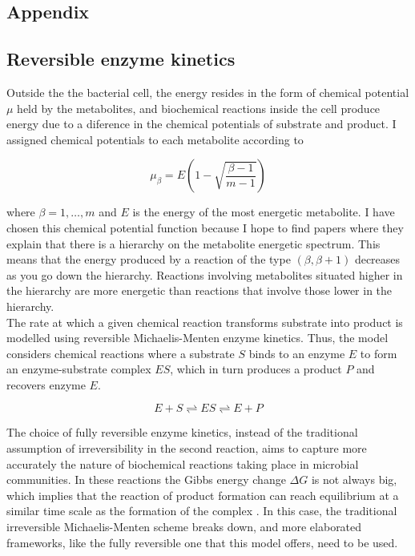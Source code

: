 \documentclass[titlepage,11pt]{article}
\begin{document}
\begin{linenumbers}
\begin{singlespace}
\section{Appendix}
\subsection{Reversible enzyme kinetics}\label{subsed:reversible_enzyme_kinetics}
Outside the the bacterial cell, the energy resides in the form of chemical potential $ \mu $ held by the metabolites, and biochemical reactions inside the cell produce energy due to a diference in the chemical potentials of substrate and product. I assigned chemical potentials to each metabolite according to
\begin{linenomath*}	
	\begin{equation}
	\mu_{\beta} = E \left(1 - \sqrt{\frac{\beta-1}{m-1}}\right)
	\end{equation}
\end{linenomath*}	
where $ \beta = 1, \dots, m $ and $ E $ is the energy of the most energetic metabolite.
I have chosen this chemical potential function because I hope to find papers where they explain that there is a hierarchy on the metabolite energetic spectrum. This means that the energy produced by a reaction of the type $ (\beta, \beta+1) $ decreases as you go down the hierarchy. Reactions involving metabolites situated higher in the hierarchy are more energetic than reactions that involve those lower in the hierarchy.\\
The rate at which a given chemical reaction transforms substrate into product is modelled using reversible Michaelis-Menten enzyme kinetics. Thus, the model considers chemical reactions where a substrate $ S $ binds to an enzyme $ E $ to form an enzyme-substrate complex $ ES $, which in turn produces a product $ P $ and recovers enzyme $ E $. 
\begin{linenomath*}	
	\begin{equation}\label{eq:react_shceme}
	E + S \rightleftharpoons ES \rightleftharpoons E + P
	\end{equation}	
\end{linenomath*}
The choice of fully reversible enzyme kinetics, instead of the traditional assumption of irreversibility in the second reaction, aims to capture more accurately the nature of biochemical reactions taking place in microbial communities. In these reactions the Gibbs energy change $ \Delta G $ is not always big, which implies that the reaction of product formation can reach equilibrium at a similar time scale as the formation of the complex \citep{Keener2008}. In this case, the traditional irreversible Michaelis-Menten scheme breaks down, and more elaborated frameworks, like the fully reversible one that this model offers, need to be used.\\

\end{singlespace}
\end{linenumbers}
\end{document}
